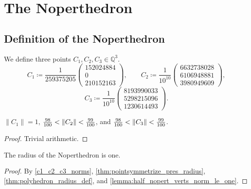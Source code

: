 \chapter{The Noperthedron}

\section{Definition of the Noperthedron}

We define three points $C_1,C_2,C_3\in \mathbb{Q}^3$.
\[
    C_1\coloneqq
        \frac{1}{259375205}
        \begin{pmatrix}
        {152024884} \\ 0 \\ {210152163}
        \end{pmatrix},
\qquad
    C_2\coloneqq \frac{1}{10^{10}}
        \begin{pmatrix}
        6632738028 \\ 6106948881 \\ 3980949609
        \end{pmatrix},
\]
\[
    C_3\coloneqq
        \frac{1}{10^{10}}
        \begin{pmatrix}
        8193990033 \\ 5298215096 \\ 1230614493
        \end{pmatrix}.
\]

\begin{lemma}
\label{c1_c2_c3_norms}
\leanok
$\| C_1 \| = 1$,
${98 \over 100} < \| C_2 \| < {99 \over 100}$, and
${98 \over 100} < \| C_3 \| < {99 \over 100}$.
\end{lemma}
\begin{proof}
\leanok
Trivial arithmetic.
\end{proof}

\begin{lemma}
\label{lem:radius_noperthedron_one}
\leanok
The radius of the Noperthedron is one.
\end{lemma}
\begin{proof}
\leanok
{}
By \cref{c1_c2_c3_norms}, \cref{thm:pointsymmetrize_pres_radius}, \cref{thm:polyhedron_radius_def},
and \cref{lemma:half_nopert_verts_norm_le_one}.
\end{proof}

